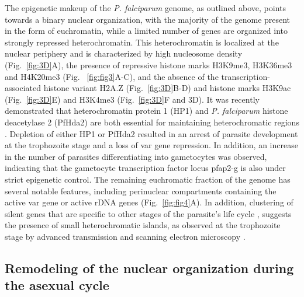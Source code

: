 The epigenetic makeup of the \textit{P. falciparum} genome, as outlined above, points
towards a binary nuclear organization, with the majority of the genome present
in the form of euchromatin, while a limited number of genes are organized into
strongly repressed heterochromatin. This heterochromatin is localized at the
nuclear periphery and is characterized by high nucleosome density
(Fig.~\ref{fig:3D}A),
the presence of repressive histone marks H3K9me3, H3K36me3 and H4K20me3 (Fig.
~\ref{fig:fig3}A-C), and the absence of the transcription-associated histone variant H2A.Z
(Fig.~\ref{fig:3D}B-D) and histone marks H3K9ac (Fig.~\ref{fig:3D}E) and H3K4me3
(Fig.~\ref{fig:3D}F and 3D).
It was recently demonstrated that heterochromatin protein 1 (HP1) and \textit{P.
falciparum} histone deacetylase 2 (PfHda2) are both essential for maintaining
heterochromatic regions \citep{brancucci:heterochromatin, coleman:plasmodium}.
Depletion of either HP1 or PfHda2 resulted in
an arrest of parasite development at the trophozoite stage and a loss of var
gene repression. In addition, an increase in the number of parasites
differentiating into gametocytes was observed, indicating that the gametocyte
transcription factor locus pfap2-g is also under strict epigenetic control.
The remaining euchromatic fraction of the genome has several notable features,
including perinuclear compartments containing the active var gene or active
rDNA genes (Fig.~\ref{fig:fig4}A). In addition, clustering of silent genes that are
specific to other stages of the parasite’s life cycle
\citep{ay:three-dimensional}, suggests the
presence of small heterochromatic islands, as observed at the trophozoite
stage by advanced transmission and scanning electron microscopy
\citep{weiner:3d}.

\subsection{Remodeling of the nuclear organization during the asexual cycle}

